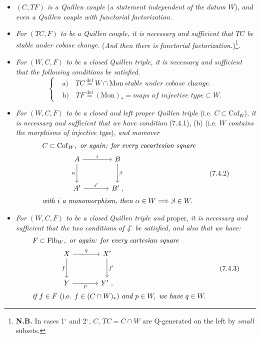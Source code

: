 \documentclass[11pt]{article}
\newcommand{\printedpage}[1]{\marginpar{\footnotesize p.~#1}}
\newcommand{\msp}[1]{\marginpar{\footnotesize [#1]}}
\newcommand{\Mon}{\mathrm{Mon}}
\newcommand{\Cof}{\mathrm{Cof}}
\newcommand{\Fib}{\mathrm{Fib}}
\begin{document}
\begin{itemize}[leftmargin=*]
\item[1$^\circ$)] \textit{$(C,TF)$ is a Quillen couple} (\textit{a statement independent of the datum $W$}), \textit{and even a Quillen couple with functorial factorization.}
\item[2$^\circ$)] \textit{For $(TC,F)$ to be a Quillen couple, it is necessary and sufficient that $TC$ be stable under cobase change.} (\textit{And then there is functorial factorization.})\footnote[36]{\textbf{N.B.} In cases 1$^\circ$ and 2$^\circ$, $C$, $TC=C\cap W$ are Q-generated on the left by \textit{small} subsets.}.
\item[3$^\circ$)] \textit{For $(W,C,F)$ to be a closed Quillen triple, it is necessary and sufficient that the following conditions be satisfied.}
\[
\left\{
\begin{aligned}
&\text{a)}\quad TC \overset{\text{def}}{=} W\cap \Mon\ \textit{stable under cobase change.}\\
&\text{b)}\quad TF \overset{\text{def}}{=} (\Mon)_* = \textit{maps of injective type} \subset W.
\end{aligned}
\right.
\tag*{(7.4.1)}
\]
\item[4$^\circ$)] \msp{page 99}\textit{For $(W,C,F)$ to be a closed and left proper Quillen triple} (i.e. $C\subset \Cof_W$), \textit{it is necessary and sufficient that we have condition} (7.4.1), (b) (i.e. \textit{$W$ contains the morphisms of injective type}), \textit{and moreover}
\[
\begin{aligned}
&C\subset \Cof_W,\ \textit{or again: for every cocartesian square}\\
&\qquad\qquad\begin{tikzcd}[ampersand replacement=\&, row sep=large, column sep=large]
A \arrow[r, "i"] \arrow[d, "\alpha"'] \& B \arrow[d, "\beta"] \\
A' \arrow[r, "i'"] \& B'\ ,
\end{tikzcd}\\
&\textit{with $i$ a monomorphism, then } \alpha\in W \Longrightarrow \beta\in W.
\end{aligned}
\tag*{(7.4.2)}
\]

\item[5$^\circ$)] \printedpage{55}
\textit{For $(W,C,F)$ to be a closed Quillen triple and} proper, \textit{it is necessary and sufficient that the two conditions of 4$^\circ$ be satisfied, and also that we have:}
\[
\begin{aligned}
&F\subset \Fib_W,\ \textit{or again: for every cartesian square}\\
&\qquad\qquad\begin{tikzcd}[ampersand replacement=\&, row sep=large, column sep=large]
X \arrow[r, "q"] \arrow[d, "f"'] \& X' \arrow[d, "f'"] \\
Y \arrow[r, "p"'] \& Y'\ ,
\end{tikzcd}\\
&\textit{if } f\in F \ (\text{i.e. } f\in (C\cap W)_*)\ \textit{and } p\in W,\ \textit{we have } q\in W.
\end{aligned}
\tag*{(7.4.3)}
\]
\end{itemize}
\end{document}
